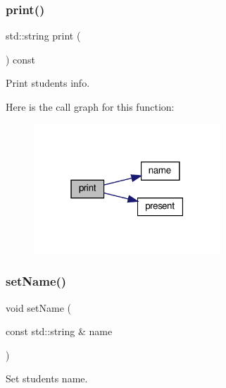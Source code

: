 \subsubsection{\texorpdfstring{print()}{print()}}
{\footnotesize\ttfamily std\+::string print (\begin{DoxyParamCaption}{ }\end{DoxyParamCaption}) const}



Print students\textquotesingle{} info. 

Here is the call graph for this function\+:
\nopagebreak
\begin{figure}[H]
\begin{center}
\leavevmode
\includegraphics[width=199pt]{classStudent_acd848ed8bb05466e6d96bd387a8326c2_cgraph}
\end{center}
\end{figure}
\mbox{\label{classStudent_a9d3a2685df23b5e7cbf59c19c4a1f9b5}} 
\subsubsection{\texorpdfstring{set\+Name()}{setName()}}
{\footnotesize\ttfamily void set\+Name (\begin{DoxyParamCaption}\item[{const std\+::string \&}]{name }\end{DoxyParamCaption})}



Set student\textquotesingle{}s name. 


